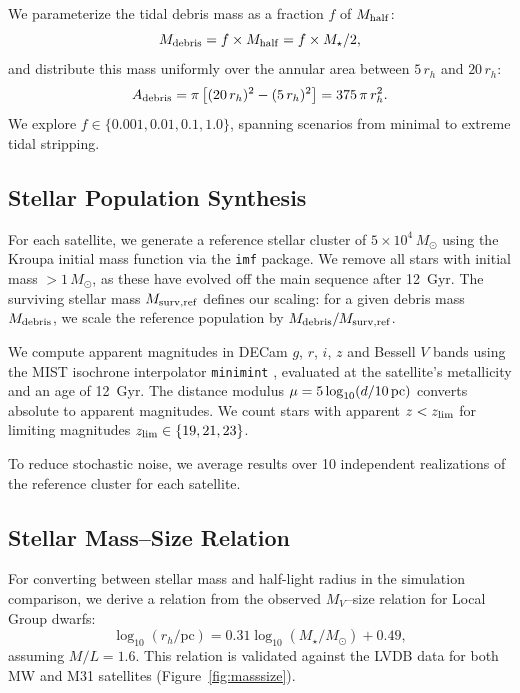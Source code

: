 \documentclass[twocolumn]{aastex63}
\begin{document}
We parameterize the tidal debris mass as a fraction $f$ of $M_{\rm half}$:
\begin{equation}
    M_{\rm debris} = f \times M_{\rm half} = f \times M_\star / 2,
\end{equation}
and distribute this mass uniformly over the annular area between $5\,r_h$ and $20\,r_h$:
\begin{equation}
    A_{\rm debris} = \pi \left[(20\,r_h)^2 - (5\,r_h)^2\right] = 375\,\pi\,r_h^2.
\end{equation}
We explore $f \in \{0.001, 0.01, 0.1, 1.0\}$, spanning scenarios from minimal to extreme tidal stripping.

\subsection{Stellar Population Synthesis} \label{sec:sps}

For each satellite, we generate a reference stellar cluster of $5 \times 10^4\,M_\odot$ using the Kroupa initial mass function \citep{Kroupa2001} via the \texttt{imf} package. We remove all stars with initial mass $> 1\,M_\odot$, as these have evolved off the main sequence after 12~Gyr. The surviving stellar mass $M_{\rm surv,ref}$ defines our scaling: for a given debris mass $M_{\rm debris}$, we scale the reference population by $M_{\rm debris} / M_{\rm surv,ref}$.

We compute apparent magnitudes in DECam $g$, $r$, $i$, $z$ and Bessell $V$ bands using the MIST isochrone interpolator \texttt{minimint} \citep{Choi2016}, evaluated at the satellite's metallicity and an age of 12~Gyr. The distance modulus $\mu = 5\log_{10}(d/\text{10\,pc})$ converts absolute to apparent magnitudes. We count stars with apparent $z < z_{\rm lim}$ for limiting magnitudes $z_{\rm lim} \in \{19, 21, 23\}$.

To reduce stochastic noise, we average results over 10 independent realizations of the reference cluster for each satellite.

\subsection{Stellar Mass--Size Relation} \label{sec:masssize}

For converting between stellar mass and half-light radius in the simulation comparison, we derive a relation from the observed $M_V$--size relation for Local Group dwarfs:
\begin{equation}
    \log_{10}(r_h / \text{pc}) = 0.31 \log_{10}(M_\star / M_\odot) + 0.49,
\end{equation}
assuming $M/L = 1.6$. This relation is validated against the LVDB data for both MW and M31 satellites (Figure~\ref{fig:masssize}).
\end{document}
